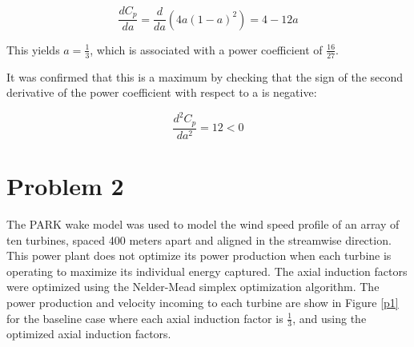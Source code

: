 \documentclass{article}
\begin{document}
\begin{equation}
\frac{d C_p}{da} = \frac{d}{da}(4a(1-a)^2) = 4 - 12 a
\end{equation}

This yields $a=\frac{1}{3}$, which is associated with a power coefficient of $\frac{16}{27}$.

It was confirmed that this is a maximum by checking that the sign of the second derivative of the power coefficient with respect to a is negative:

\begin{equation}
\frac{d^2C_p}{da^2} = 12 < 0
\end{equation}

\section{Problem 2}
The PARK wake model was used to model the 
wind speed profile of an array of ten turbines, spaced 400 meters apart and aligned in the streamwise direction. This power plant does not optimize its power production when each turbine is operating to maximize its individual energy captured. The axial induction factors were optimized using the Nelder-Mead simplex optimization algorithm. The power production and velocity incoming to each turbine are show in Figure \ref{p1} for the baseline case where each axial induction factor is $\frac{1}{3}$, and using the optimized axial induction factors. 
\end{document}
